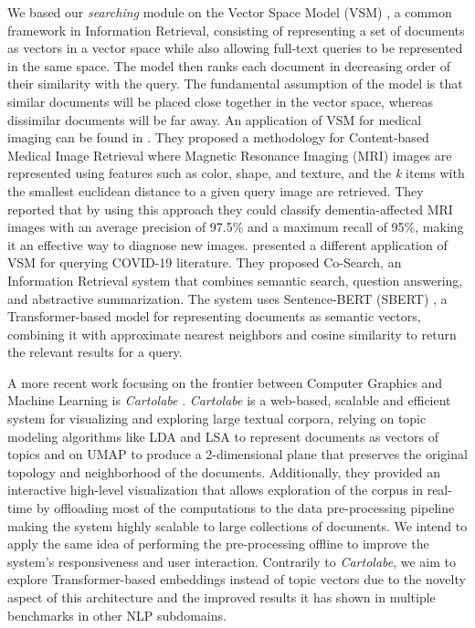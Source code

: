 \documentclass[a4paper]{article}
\begin{document}
We based our \emph{searching} module on the Vector Space Model (VSM) \citep[p.~120-126]{schutze2008}, a common framework in Information Retrieval, consisting of representing a set of documents as vectors in a vector space while also allowing full-text queries to be represented in the same space. The model then ranks each document in decreasing order of their similarity with the query. The fundamental assumption of the model is that similar documents will be placed close together in the vector space, whereas dissimilar documents will be far away. An application of VSM for medical imaging can be found in \citep{sampathila2020}. They proposed a methodology for Content-based Medical Image Retrieval where Magnetic Resonance Imaging (MRI) images are represented using features such as color, shape, and texture, and the \emph{k} items with the smallest euclidean distance to a given query image are retrieved. They reported that by using this approach they could classify dementia-affected MRI images with an average precision of 97.5\% and a maximum recall of 95\%, making it an effective way to diagnose new images. \citet{esteva2020} presented a different application of VSM for querying COVID-19 literature. They proposed Co-Search, an Information Retrieval system that combines semantic search, question answering, and abstractive summarization. The system uses Sentence-BERT (SBERT) \citep{reimers2019}, a Transformer-based model for representing documents as semantic vectors, combining it with approximate nearest neighbors and cosine similarity to return the relevant results for a query.

A more recent work focusing on the frontier between Computer Graphics and Machine Learning is \emph{Cartolabe} \citep{caillou2021}. \emph{Cartolabe} is a web-based, scalable and efficient system for visualizing and exploring large textual corpora, relying on topic modeling algorithms like LDA \citep{blei2003} and LSA \citep{deerwester1990} to represent documents as vectors of topics and on UMAP \citep{mcinnes2020} to produce a 2-dimensional plane that preserves the original topology and neighborhood of the documents. Additionally, they provided an interactive high-level visualization that allows exploration of the corpus in real-time by offloading most of the computations to the data pre-processing pipeline making the system highly scalable to large collections of documents. We intend to apply the same idea of performing the pre-processing offline to improve the system's responsiveness and user interaction. Contrarily to \emph{Cartolabe}, we aim to explore Transformer-based embeddings instead of topic vectors due to the novelty aspect of this architecture and the improved results it has shown in multiple benchmarks in other NLP subdomains.
\end{document}

